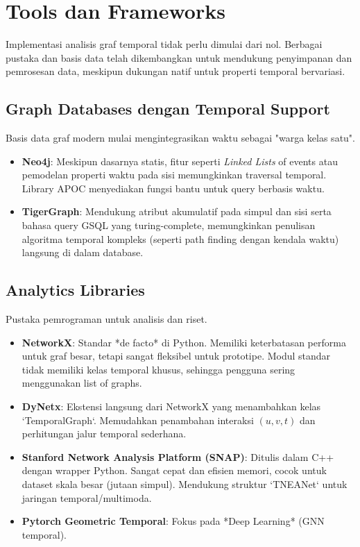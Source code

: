 \documentclass[12pt,a4paper]{book}
\begin{document}
\chapter{Tools dan Frameworks}
Implementasi analisis graf temporal tidak perlu dimulai dari nol. Berbagai pustaka dan basis data telah dikembangkan untuk mendukung penyimpanan dan pemrosesan data, meskipun dukungan natif untuk properti temporal bervariasi.

\section{Graph Databases dengan Temporal Support}
Basis data graf modern mulai mengintegrasikan waktu sebagai "warga kelas satu".
\begin{itemize}
    \item \textbf{Neo4j}: Meskipun dasarnya statis, fitur seperti \textit{Linked Lists} of events atau pemodelan properti waktu pada sisi memungkinkan traversal temporal. Library APOC menyediakan fungsi bantu untuk query berbasis waktu.
    \item \textbf{TigerGraph}: Mendukung atribut akumulatif pada simpul dan sisi serta bahasa query GSQL yang turing-complete, memungkinkan penulisan algoritma temporal kompleks (seperti path finding dengan kendala waktu) langsung di dalam database.
\end{itemize}

\section{Analytics Libraries}
Pustaka pemrograman untuk analisis dan riset.
\begin{itemize}
    \item \textbf{NetworkX}: Standar *de facto* di Python. Memiliki keterbatasan performa untuk graf besar, tetapi sangat fleksibel untuk prototipe. Modul standar tidak memiliki kelas temporal khusus, sehingga pengguna sering menggunakan list of graphs.
    \item \textbf{DyNetx}: Ekstensi langsung dari NetworkX yang menambahkan kelas `TemporalGraph`. Memudahkan penambahan interaksi $(u, v, t)$ dan perhitungan jalur temporal sederhana.
    \item \textbf{Stanford Network Analysis Platform (SNAP)}: Ditulis dalam C++ dengan wrapper Python. Sangat cepat dan efisien memori, cocok untuk dataset skala besar (jutaan simpul). Mendukung struktur `TNEANet` untuk jaringan temporal/multimoda.
    \item \textbf{Pytorch Geometric Temporal}: Fokus pada *Deep Learning* (GNN temporal).
\end{itemize}
\end{document}
